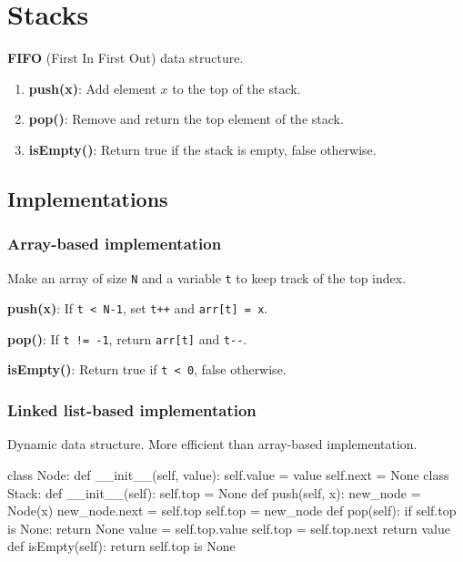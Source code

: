 \section{Stacks}
\textbf{FIFO} (First In First Out) data structure.

\begin{enumerate}
    \setlength\itemsep{0em}
    \item \textbf{push(x)}: Add element $x$ to the top of the stack.
    \item \textbf{pop()}: Remove and return the top element of the stack.
    \item \textbf{isEmpty()}: Return true if the stack is empty, false otherwise.
\end{enumerate}

\subsection{Implementations}
\subsubsection{Array-based implementation}
Make an array of size \verb|N| and a variable \verb|t| to keep track of the top index.

\begin{list}{}{}
    \setlength\itemsep{0em}
    \item \textbf{push(x)}: If \verb|t < N-1|, set \verb|t++| and \verb|arr[t] = x|.
    \item \textbf{pop()}: If \verb|t != -1|, return \verb|arr[t]| and \verb|t--|.
    \item \textbf{isEmpty()}: Return true if \verb|t < 0|, false otherwise.
\end{list}

\subsubsection{Linked list-based implementation}
Dynamic data structure. More efficient than array-based implementation.

\begin{python}
class Node:
    def __init__(self, value):
        self.value = value
        self.next = None
class Stack:
    def __init__(self):
        self.top = None
    def push(self, x):
        new_node = Node(x)
        new_node.next = self.top
        self.top = new_node
    def pop(self):
        if self.top is None:
            return None
        value = self.top.value
        self.top = self.top.next
        return value
    def isEmpty(self):
        return self.top is None
\end{python}


